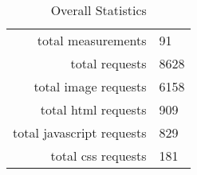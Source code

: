 \begin{table}[h]
\caption{Overall Statistics}\centering
\begin{tabular}{rl}
total measurements & 91\\
total requests & 8628\\
total image requests & 6158\\
total html requests & 909\\
total javascript requests & 829\\
total css requests & 181\\
\end{tabular}
\end{table}
